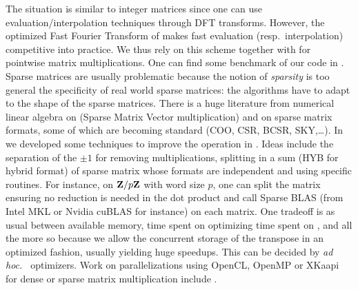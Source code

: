 %
%
The situation is similar to integer matrices since one can use
evaluation/interpolation techniques through DFT transforms. However, the
optimized Fast Fourier Transform of \cite{Harvey:2014}  makes fast evaluation
(resp.\ interpolation) competitive into practice. We thus rely on this scheme
together with \fgemm for pointwise matrix multiplications. One can find some
benchmark of our code in \cite{GioLeb14}.
%
%
Sparse matrices are usually problematic because the notion of \emph{sparsity}
is too general \vs the specificity of real world sparse matrices: the
algorithms have to adapt to the shape of the sparse matrices.
%
There is a huge literature from numerical linear algebra  on \spmv (Sparse
Matrix Vector multiplication) and on sparse matrix formats, some of which are
becoming standard (COO, CSR, BCSR, SKY,\ldots).  In \cite{Boyer:2010:spmv} we
developed some techniques to improve the \spmv operation in \linbox. Ideas
include the separation of the $\pm 1$ for removing multiplications, splitting
in a sum (HYB for hybrid format) of sparse matrix  whose formats are
independent and using specific routines. For instance, on $\mathbf{Z}{/ p\mathbf{Z}}$ with
word size $p$, one can split the matrix ensuring no reduction is needed  in the
dot product and call Sparse BLAS (from Intel \textsf{MKL} or Nvidia
\textsf{cuBLAS} for instance) on each matrix. One tradeoff is as usual between
available memory, time spent on optimizing \vs time spent on \apply, and all
the more so because we allow the concurrent storage of the transpose in an
optimized fashion, usually yielding huge speedups. This can be decided by
\emph{ad hoc.\ } optimizers.
%
Work on parallelizations using \textsf{OpenCL}, \textsf{OpenMP} or
\textsf{XKaapi} for dense or sparse matrix multiplication include
\cite{Boyer:2010:spmv,WST12,DGPZ14}.

\begin{comment} %
\paragraph{}
These state-of-the-art algorithms, often interdependent, need to be selected
by the \mul solution, possibly using a Method/Helper parameter. The
Controller/Module model works particularly well here: cascading, switch
methods, algorithms selection is made easy. Besides, the choosing of a
particular algorithms or base case is never settled in advance: the library has
to be tuned wrt. available libraries, local performance of these libraries.
\end{comment}

